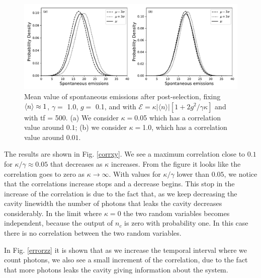 \documentclass[%
 reprint,
 amsmath,amssymb,
 aps, 
]{revtex4-1}
\begin{document}
\begin{center}
\begin{figure}[!t]
\begin{center}
\includegraphics[scale = 0.7]{lastgraph1.pdf}
\caption{\small{Mean value of spontaneous emissions after post-selection, fixing $\expval{n} \approx 1$, $\gamma =$ 1.0, $g = $ 0.1, and with  $\mathcal{E} =  \kappa |\langle n \rangle|[1 + 2g^2/\gamma \kappa]$ and with tf = 500. (a) We consider $\kappa = $0.05 which has a correlation value around $0.1$; (b) we consider $\kappa = $1.0, which has a correlation value around $0.01$.}} \label{probdisult}
\end{center}
\end{figure}
\end{center}
The results are shown in Fig. \ref{corrxy}. We see a maximum
correlation close to $0.1$ for $\kappa/\gamma\approx 0.05$ that
decreases as $\kappa$ increases. From the figure it looks like the
correlation goes to zero as $\kappa\rightarrow\infty$. With values for
$\kappa/\gamma$ lower than $0.05$, we notice that the correlations
increase stops and a decrease begins. This stop in the increase of the
correlation is due to the fact that, as we keep decreasing the cavity
linewidth the number of photons that leaks the cavity decreases
considerably. In the limit where $\kappa=0$ the two random
variables becomes independent, because the output of $n_c$ is zero
with probability one. In this case there is no correlation between the two
random variables.





In Fig. \ref{errorzz} it is shown that as we increase the temporal
interval where we count photons, we also see a small increment of the
correlation, due to the fact that more photons leaks the cavity
giving information about the system.
\end{document}
